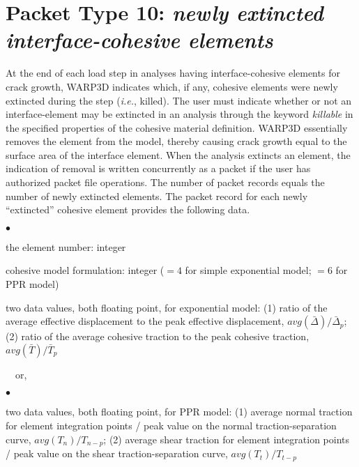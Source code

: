 \documentclass[10pt]{report}
\numberwithin{equation}{section}
\newcommand{\ie}{\ti{i.e.},\xspace}
\newcommand{\ti}{\emph}
\newcommand{\squishlist}{
 \begin{list}{$\bullet$}
  { \setlength{\itemsep}{0pt}
     \setlength{\parsep}{3pt}
     \setlength{\topsep}{3pt}
     \setlength{\partopsep}{0pt}
     \setlength{\leftmargin}{1.5em}
     \setlength{\labelwidth}{1em}
     \setlength{\labelsep}{0.5em} } }
\newcommand{\squishend}{
  \end{list}  }
\begin{document}
\section{Packet Type 10: \ti{newly extincted interface-cohesive elements}}
At the end of each load step in analyses having interface-cohesive elements 
for crack growth, WARP3D indicates which, if any, cohesive elements 
were newly extincted during the step (\ie killed). The user must indicate whether or not
an interface-element may be extincted in an analysis through the keyword
\ti{killable} in the specified
properties of the cohesive material definition. WARP3D essentially removes the 
element from the model, 
thereby causing crack growth equal to the surface area of the interface element. 
When the analysis extincts an element, the indication 
of removal is written concurrently as a packet if the user has authorized 
packet file operations. 
The number of packet records equals the number of newly extincted elements.
The packet record for each newly ``extincted'' cohesive 
element provides the following data.
\squishlist
\item the element number:  integer
\item cohesive model formulation: integer ($=4$ for simple exponential model; 
$= 6$ for PPR model)
\item two data values, both floating point, for exponential model:
  (1) ratio of the average effective displacement to the peak effective 
  displacement, $avg(\bar \Delta)/ \bar \Delta_p$;  
  (2) ratio of the average cohesive traction to the peak cohesive 
  traction, $avg(\bar T) / \bar T_p$
\squishend
\ \ or,
\squishlist
\item two data values, both floating point, for PPR model: (1) average 
normal traction for 
element integration points / peak value on the normal traction-separation 
curve, $avg(T_n) / T_{n-p}$;
  (2) average shear traction for element integration points / peak value on 
  the shear traction-separation curve, $avg(T_t) / T_{t-p}$
\squishend

%
%
\end{document}
